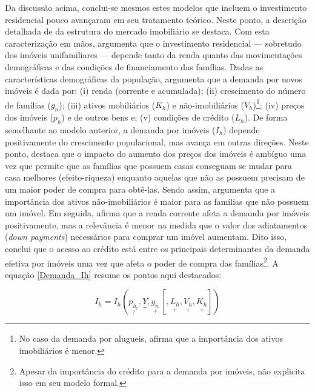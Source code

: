 Da discussão acima, 
conclui-se mesmos estes modelos que incluem o investimento residencial pouco avançaram em seu tratamento teórico.
Neste ponto, a descrição detalhada de \textcite{duesenberry_investment_1958} da estrutura do mercado imobiliário se destaca.
Com esta caracterização em mãos, argumenta que o investimento residencial --- sobretudo dos imóveis unifamiliares --- depende tanto da renda quanto das movimentações demográficas e das condições de financiamento das famílias.
Dadas as características demográficas da população, argumenta que a demanda por novos imóveis é dada por:
	(i) renda (corrente e acumulada);
	(ii) crescimento do número de famílias ($g_n$);
	(iii) ativos mobiliários ($K_h$) e não-imobiliários ($V_h$)\footnote{No caso da demanda por alugueis, \textcite{duesenberry_investment_1958} afirma que a importância dos ativos imobiliários é menor.};
	(iv) preços dos imóveis ($p_h$) e de outros bens e;
	(v) condições de crédito ($L_h$).
De forma semelhante ao modelo anterior, a demanda por imóveis ($I_h$) depende positivamente do crescimento populacional, mas avança em outras direções.
Neste ponto, \textcite{duesenberry_investment_1958} destaca que o impacto do aumento dos preços dos imóveis é ambíguo uma vez que permite que as famílias que possuem casas conseguam se mudar para casa melhores (efeito-riqueza) enquanto aquelas que não as possuem  precisam de um maior poder de compra para obtê-las.
Sendo assim, argumenta que a importância dos ativos não-imobiliários é maior para as famílias que não possuem um imóvel.
Em seguida, afirma que a renda corrente afeta a demanda por imóveis positivamente, mas a relevância é menor na medida que o valor dos adiatamentos (\textit{down payments}) necessários para comprar um imóvel aumentam.
Dito isso, conclui que o acesso ao crédito está entre os principais determinantes da demanda efetiva por imóveis uma vez que afeta o poder de compra das famílias\footnote{
Apesar da importância do crédito para a demanda por imóveis, \textcite{duesenberry_investment_1958} não explicita isso em seu modelo formal.
}.
A equação \ref{Demanda_Ih} resume os pontos aqui destacados:

\begin{equation}
\label{Demanda_Ih}
I_{h} = I_h(\underset{?}{p_{h_t}}, \underset{+}{Y}, \underset{+}{g_n}\, [, \underset{+}{L_h}, \underset{+}{V_h}, \underset{+}{K_h}])
\end{equation}

